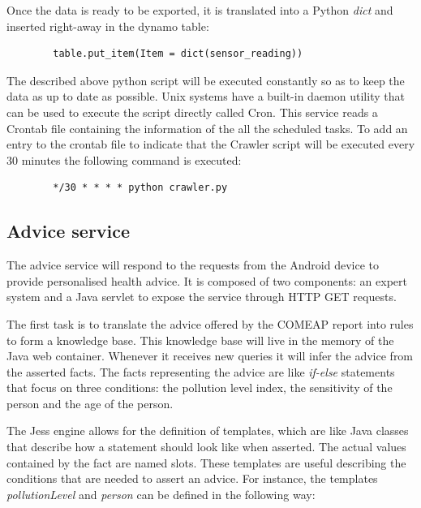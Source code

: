 Once the data is ready to be exported, it is translated into a Python \textit{dict} and inserted right-away in the dynamo table: \bigskip

{\centering
\begin{BVerbatim}
        table.put_item(Item = dict(sensor_reading))
\end{BVerbatim}
\par
}\bigskip


The described above python script will be executed constantly so as to keep the data as up to date as possible. Unix systems have a built-in daemon utility that can be used to execute the script directly called Cron. This service reads a Crontab file containing the information of the all the scheduled tasks. To add an entry to the crontab file to indicate that the Crawler script will be executed every 30 minutes the following command is executed: \bigskip

{\centering
\begin{BVerbatim}
        */30 * * * * python crawler.py
\end{BVerbatim}
\par
}

\subsection{Advice service}
The advice service will respond to the requests from the Android device to provide personalised health advice. It is composed of two components: an expert system and a Java servlet to expose the service through HTTP GET requests. 

The first task is to translate the advice offered by the COMEAP report into rules to form a knowledge base. This knowledge base will live in the memory of the Java web container. Whenever it receives new queries it will infer the advice from the asserted facts. The facts representing the advice are like \textit{if-else} statements that focus on three conditions: the pollution level index, the sensitivity of the person and the age of the person. 

The Jess engine allows for the definition of templates, which are like Java classes that describe how a statement should look like when asserted. The actual values contained by the fact are named slots. These templates are useful describing the conditions that are needed to assert an advice. For instance, the templates \textit{pollutionLevel} and \textit{person} can be defined in the following way: 

